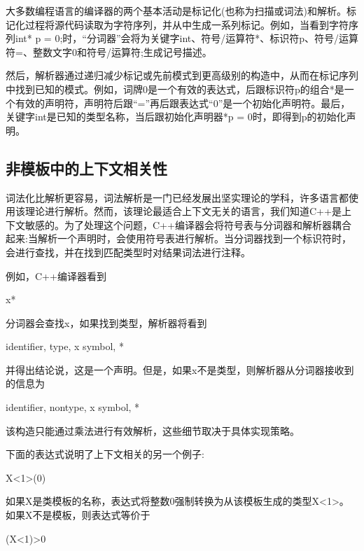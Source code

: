 
大多数编程语言的编译器的两个基本活动是标记化(也称为扫描或词法)和解析。标记化过程将源代码读取为字符序列，并从中生成一系列标记。例如，当看到字符序列int* p = 0;时，“分词器”会将为关键字int、符号/运算符*、标识符p、符号/运算符=、整数文字0和符号/运算符;生成记号描述。

然后，解析器通过递归减少标记或先前模式到更高级别的构造中，从而在标记序列中找到已知的模式。例如，词牌0是一个有效的表达式，后跟标识符p的组合*是一个有效的声明符，声明符后跟“=”再后跟表达式“0”是一个初始化声明符。最后，关键字int是已知的类型名称，当后跟初始化声明器*p = 0时，即得到p的初始化声明。

\subsection{非模板中的上下文相关性}

词法化比解析更容易，词法解析是一门已经发展出坚实理论的学科，许多语言都使用该理论进行解析。然而，该理论最适合上下文无关的语言，我们知道C++是上下文敏感的。为了处理这个问题，C++编译器会将符号表与分词器和解析器耦合起来:当解析一个声明时，会使用符号表进行解析。当分词器找到一个标识符时，会进行查找，并在找到匹配类型时对结果词法进行注释。

例如，C++编译器看到

\begin{cpp}
x*
\end{cpp}

分词器会查找x，如果找到类型，解析器将看到

\begin{cpp}
identifier, type, x
symbol, *
\end{cpp}

并得出结论说，这是一个声明。但是，如果x不是类型，则解析器从分词器接收到的信息为

\begin{cpp}
identifier, nontype, x
symbol, *
\end{cpp}

该构造只能通过乘法进行有效解析，这些细节取决于具体实现策略。

下面的表达式说明了上下文相关的另一个例子:

\begin{cpp}
X<1>(0)
\end{cpp}

如果X是类模板的名称，表达式将整数0强制转换为从该模板生成的类型X<1>。如果X不是模板，则表达式等价于

\begin{cpp}
(X<1)>0
\end{cpp}

